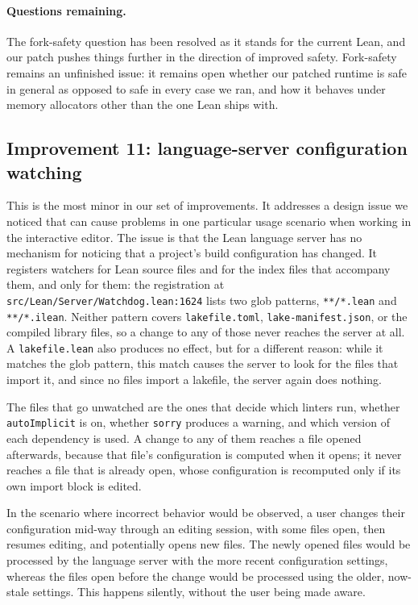 \documentclass{article}
\newcommand{\Lean}{Lean\xspace}      %
\begin{document}
\paragraph{Questions remaining.} The fork-safety question has been resolved as it stands for the current \Lean, and our patch pushes things further in the direction of improved safety. Fork-safety remains an unfinished issue: it remains open whether our patched runtime is safe in general as opposed to safe in every case we ran, and how it behaves under memory allocators other than the one \Lean ships with.

\subsection{Improvement 11: language-server configuration watching}
\label{sec:tn-11}

This is the most minor in our set of improvements. It addresses a design issue we noticed that can cause problems in one particular usage scenario when working in the interactive editor.
The issue is that the \Lean language server has no mechanism for noticing that a project's build configuration has changed. It registers watchers for \Lean source files and for the index files that accompany them, and only for them: the registration at \texttt{src/Lean/Server/Watchdog.lean:1624} lists two glob patterns, \texttt{**/*.lean} and \texttt{**/*.ilean}. Neither pattern covers \texttt{lakefile.toml}, \texttt{lake-manifest.json}, or the compiled library files, so a change to any of those never reaches the server at all. A \texttt{lakefile.lean} also produces no effect, but for a different reason: while it matches the glob pattern, this match causes the server to look for the files that import it, and since no files import a lakefile, the server again does nothing.

The files that go unwatched are the ones that decide which linters run, whether \texttt{autoImplicit} is on, whether \texttt{sorry} produces a warning, and which version of each dependency is used. A change to any of them reaches a file opened afterwards, because that file's configuration is computed when it opens; it never reaches a file that is already open, whose configuration is recomputed only if its own import block is edited.

In the scenario where incorrect behavior would be observed, a user changes their configuration mid-way through an editing session, with some files open, then resumes editing, and potentially opens new files. The newly opened files would be processed by the language server with the more recent configuration settings, whereas the files open before the change would be processed using the older, now-stale settings. This happens silently, without the user being made aware.
\end{document}
